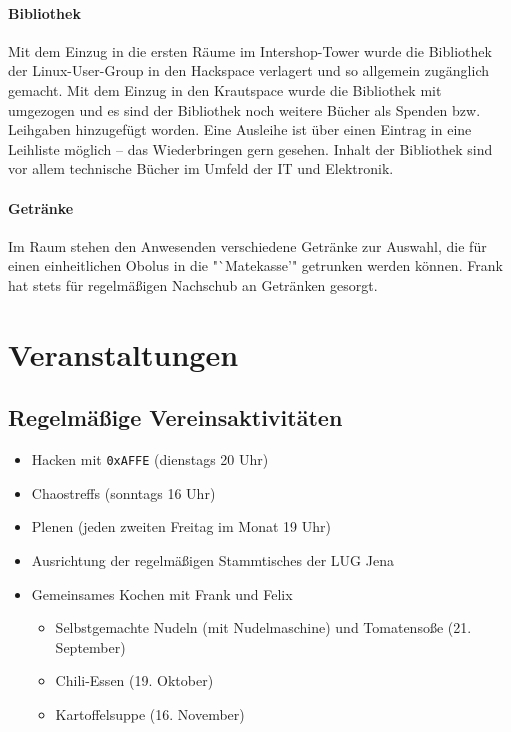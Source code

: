 \documentclass[10pt,DIV16]{scrartcl}
\begin{document}
\paragraph{Bibliothek}

Mit dem Einzug in die ersten Räume im Intershop-Tower wurde die
Bibliothek der Linux-User-Group in den Hackspace verlagert und so
allgemein zugänglich gemacht. Mit dem Einzug in den Krautspace wurde
die Bibliothek mit umgezogen und es sind der Bibliothek noch weitere
Bücher als Spenden bzw. Leihgaben hinzugefügt worden. Eine Ausleihe
ist über einen Eintrag in eine Leihliste möglich -- das
Wiederbringen gern gesehen. Inhalt der Bibliothek sind vor allem
technische Bücher im Umfeld der IT und Elektronik.

\paragraph{Getränke}

Im Raum stehen den Anwesenden verschiedene Getränke zur Auswahl, die 
für einen einheitlichen Obolus in die "`Matekasse'" getrunken werden 
können. Frank hat stets für regelmäßigen Nachschub an Getränken 
gesorgt.

\section{Veranstaltungen}

\subsection{Regelmäßige Vereinsaktivitäten}

\begin{itemize}
	\item Hacken mit \texttt{0xAFFE} (dienstags 20 Uhr)
	\item Chaostreffs (sonntags 16 Uhr)
	\item Plenen (jeden zweiten Freitag im Monat 19 Uhr)
	\item Ausrichtung der regelmäßigen Stammtisches der LUG Jena
	\item Gemeinsames Kochen mit Frank und Felix
		\begin{itemize}
			\item Selbstgemachte Nudeln (mit Nudelmaschine) und
				Tomatensoße (21. September)
			\item Chili-Essen (19. Oktober)
			\item Kartoffelsuppe (16. November)
		\end{itemize}
\end{itemize}
\end{document}
